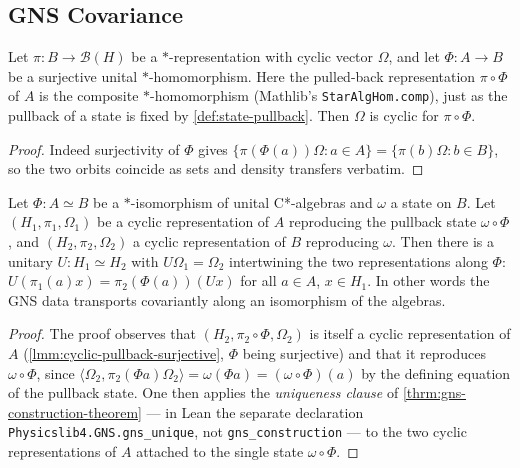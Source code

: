 \subsection{GNS Covariance}

\begin{lemma}
    \label{lmm:cyclic-pullback-surjective}
    \leanok
    Let $\pi : B \to \mathcal{B}(H)$ be a $*$-representation with cyclic vector $\Omega$, and let $\Phi : A \to B$ be a surjective unital $*$-homomorphism. Here the pulled-back representation $\pi \circ \Phi$ of $A$ is the composite $*$-homomorphism (Mathlib's \texttt{StarAlgHom.comp}), just as the pullback of a state is fixed by \ref{def:state-pullback}. Then $\Omega$ is cyclic for $\pi \circ \Phi$.
\end{lemma}
\begin{proof}
    \leanok
    Indeed surjectivity of $\Phi$ gives $\{\pi(\Phi(a))\Omega : a \in A\} = \{\pi(b)\Omega : b \in B\}$, so the two orbits coincide as sets and density transfers verbatim.
\end{proof}

\begin{theorem}
    \label{thrm:gns-covariance}
    \leanok
    Let $\Phi : A \simeq B$ be a $*$-isomorphism of unital C*-algebras and $\omega$ a state on $B$. Let $(H_1, \pi_1, \Omega_1)$ be a cyclic representation of $A$ reproducing the pullback state $\omega \circ \Phi$, and $(H_2, \pi_2, \Omega_2)$ a cyclic representation of $B$ reproducing $\omega$. Then there is a unitary $U : H_1 \simeq H_2$ with $U\Omega_1 = \Omega_2$ intertwining the two representations along $\Phi$: $U(\pi_1(a)x) = \pi_2(\Phi(a))(Ux)$ for all $a \in A$, $x \in H_1$. In other words the GNS data transports covariantly along an isomorphism of the algebras.
\end{theorem}
\begin{proof}
    \leanok
    The proof observes that $(H_2, \pi_2 \circ \Phi, \Omega_2)$ is itself a cyclic representation of $A$ (\ref{lmm:cyclic-pullback-surjective}, $\Phi$ being surjective) and that it reproduces $\omega \circ \Phi$, since $\langle \Omega_2, \pi_2(\Phi a)\Omega_2\rangle = \omega(\Phi a) = (\omega \circ \Phi)(a)$ by the defining equation of the pullback state. One then applies the \emph{uniqueness clause} of \ref{thrm:gns-construction-theorem} --- in Lean the separate declaration \texttt{Physicslib4.GNS.gns\_unique}, not \texttt{gns\_construction} --- to the two cyclic representations of $A$ attached to the single state $\omega \circ \Phi$.
\end{proof}

